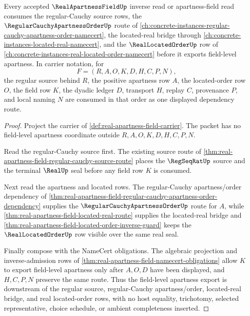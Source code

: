 \begin{theorem}
\label{thm:real-apartness-field-route-repair}
Every accepted $\RealApartnessFieldUp$ inverse read or apartness-field read consumes the regular-Cauchy source rows, the $\RegularCauchyApartnessOrderUp$ route of \autoref{ch:concrete-instances-regular-cauchy-apartness-order-namecert}, the located-real bridge through \autoref{ch:concrete-instances-located-real-namecert}, and the $\RealLocatedOrderUp$ row of \autoref{ch:concrete-instances-real-located-order-namecert} before it exports field-level apartness. In carrier notation, for
$$
F=(R,A,O,K,D,H,C,P,N),
$$
the regular source behind $R$, the positive apartness row $A$, the located-order row $O$, the field row $K$, the dyadic ledger $D$, transport $H$, replay $C$, provenance $P$, and local naming $N$ are consumed in that order as one displayed dependency route.
\end{theorem}
\begin{proof}
Project the carrier of \autoref{def:real-apartness-field-carrier}. The packet has no field-level apartness coordinate outside $R,A,O,K,D,H,C,P,N$.

Read the regular-Cauchy source first. The existing source route of \autoref{thm:real-apartness-field-regular-cauchy-source-route} places the $\RegSeqRatUp$ source and the terminal $\RealUp$ seal before any field row $K$ is consumed.

Next read the apartness and located rows. The regular-Cauchy apartness/order dependency of \autoref{thm:real-apartness-field-regular-cauchy-apartness-order-dependency} supplies the $\RegularCauchyApartnessOrderUp$ route for $A$, while \autoref{thm:real-apartness-field-located-real-route} supplies the located-real bridge and \autoref{thm:real-apartness-field-located-order-inverse-guard} keeps the $\RealLocatedOrderUp$ row visible over the same real seal.

Finally compose with the NameCert obligations. The algebraic projection and inverse-admission rows of \autoref{thm:real-apartness-field-namecert-obligations} allow $K$ to export field-level apartness only after $A,O,D$ have been displayed, and $H,C,P,N$ preserve the same route. Thus the field-level apartness export is downstream of the regular source, regular-Cauchy apartness/order, located-real bridge, and real located-order rows, with no host equality, trichotomy, selected representative, choice schedule, or ambient completeness inserted.
\end{proof}
